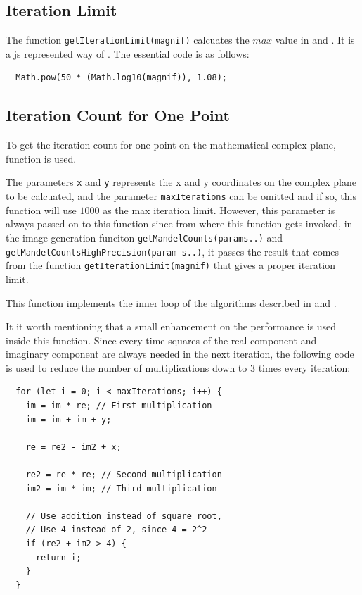 \subsection{Iteration Limit}

The function \texttt{getIterationLimit(magnif)} calcuates the $max$ value in  and . It is a \gls{js} represented way of . The essential code is as follows:

\begin{verbatim}
  Math.pow(50 * (Math.log10(magnif)), 1.08);
\end{verbatim}

\subsection{Iteration Count for One Point}

To get the iteration count for one point on the mathematical complex plane, function  is used.

The parameters \texttt{x} and \texttt{y} represents the x and y coordinates on the complex plane to be calcuated, and the parameter \texttt{maxIterations} can be omitted and if so, this function will use $1000$ as the max iteration limit. However, this parameter is always passed on to this function since from where this function gets invoked, in the image generation funciton \texttt{getMandelCounts(params..)} and \texttt{getMandelCountsHighPrecision(param s..)}, it passes the result that comes from the function \texttt{getIterationLimit(magnif)} that gives a proper iteration limit.

This function implements the inner loop of the algorithms described in  and .

It it worth mentioning that a small enhancement on the performance is used inside this function. Since every time squares of the real component and imaginary component are always needed in the next iteration, the following code is used to reduce the number of multiplications down to $3$ times every iteration:

\begin{verbatim}
  for (let i = 0; i < maxIterations; i++) {            
    im = im * re; // First multiplication
    im = im + im + y;

    re = re2 - im2 + x;

    re2 = re * re; // Second multiplication
    im2 = im * im; // Third multiplication

    // Use addition instead of square root,
    // Use 4 instead of 2, since 4 = 2^2
    if (re2 + im2 > 4) {
      return i;
    }
  }
\end{verbatim}

